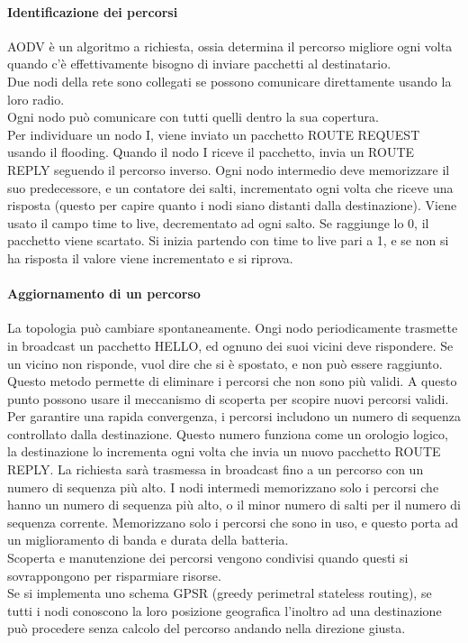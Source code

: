\documentclass{article}
\begin{document}
\paragraph{Identificazione dei percorsi}
AODV è un algoritmo a richiesta, ossia determina il percorso migliore ogni volta quando c'è effettivamente bisogno di inviare pacchetti al destinatario.\\
Due nodi della rete sono collegati se possono comunicare direttamente usando la loro radio.\\
Ogni nodo può comunicare con tutti quelli dentro la sua copertura.\\
Per individuare un nodo I, viene inviato un pacchetto ROUTE REQUEST usando il flooding. Quando il nodo I riceve il pacchetto, invia un ROUTE REPLY seguendo il percorso inverso. Ogni nodo intermedio deve memorizzare il suo predecessore, e un contatore dei salti, incrementato ogni volta che riceve una risposta (questo per capire quanto i nodi siano distanti dalla destinazione). Viene usato il campo time to live, decrementato ad ogni salto. Se raggiunge lo 0, il pacchetto viene scartato. Si inizia partendo con time to live pari a 1, e se non si ha risposta il valore viene incrementato e si riprova.
\paragraph{Aggiornamento di un percorso}
La topologia può cambiare spontaneamente. Ongi nodo periodicamente trasmette in broadcast un pacchetto HELLO, ed ognuno dei suoi vicini deve rispondere. Se un vicino non risponde, vuol dire che si è spostato, e non può essere raggiunto. Questo metodo permette di eliminare i percorsi che non sono più validi. A questo punto possono usare il meccanismo di scoperta per scopire nuovi percorsi validi. \\
Per garantire una rapida convergenza, i percorsi includono un numero di sequenza controllato dalla destinazione. Questo numero funziona come un orologio logico, la destinazione lo incrementa ogni volta che invia un nuovo pacchetto ROUTE REPLY. La richiesta sarà trasmessa in broadcast fino a un percorso con un numero di sequenza più alto. I nodi intermedi memorizzano solo i percorsi che hanno un numero di sequenza più alto, o il minor numero di salti per il numero di sequenza corrente. Memorizzano solo i percorsi che sono in uso, e questo porta ad un miglioramento di banda e durata della batteria.\\
Scoperta e manutenzione dei percorsi vengono condivisi quando questi si sovrappongono per risparmiare risorse.\\
Se si implementa uno schema GPSR (greedy perimetral stateless routing), se tutti i nodi conoscono la loro posizione geografica l'inoltro ad una destinazione può procedere senza calcolo del percorso andando nella direzione giusta. 
\end{document}
